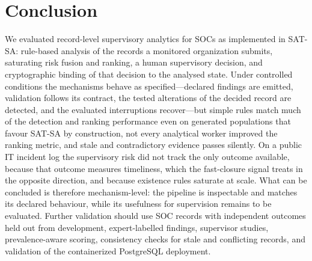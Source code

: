 \section{Conclusion}
\label{sec:conclusion}

We evaluated record-level supervisory analytics for SOCs as implemented in SAT-SA:
rule-based analysis of the records a monitored organization submits, saturating risk
fusion and ranking, a human supervisory decision, and cryptographic binding of that
decision to the analysed state. Under controlled conditions the mechanisms behave as
specified---declared findings are emitted, validation follows its contract, the tested
alterations of the decided record are detected, and the evaluated interruptions
recover---but simple rules match much of the detection and ranking performance even on
generated populations that favour SAT-SA by construction, not every analytical worker
improved the ranking metric, and stale and contradictory evidence passes silently. On a public IT incident log the
supervisory risk did not track the only outcome available, because that outcome
measures timeliness, which the fast-closure signal treats in the opposite direction,
and because existence rules saturate at scale. What can be concluded is therefore
mechanism-level: the pipeline is inspectable and matches its declared behaviour,
while its usefulness for supervision remains to be evaluated. Further validation
should use SOC records with independent outcomes held out from development,
expert-labelled findings, supervisor studies, prevalence-aware scoring, consistency
checks for stale and conflicting records, and validation of the containerized
PostgreSQL deployment.
